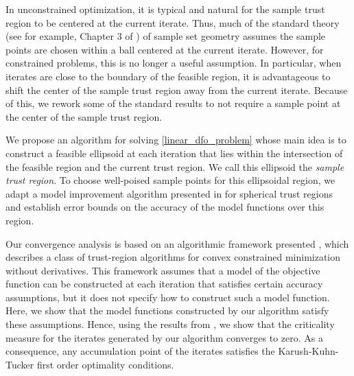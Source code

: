 \documentclass{article}
\begin{document}

In unconstrained optimization, it is typical and natural for the sample trust region to be centered at the current iterate.
Thus, much of the standard theory (see for example,
 Chapter 3 of \cite{introduction_book}) of sample set geometry assumes the sample points are chosen within a ball centered at the current iterate.
 However, for constrained problems,  this is no longer a useful assumption.
 In particular, when iterates are close to the boundary of the feasible region, it is advantageous to shift the center of the sample trust region away from the current iterate.
 Because of this, we rework some of the standard results to not require a sample point at the center of the sample trust region.


We propose an algorithm for solving \cref{linear_dfo_problem} whose main idea is to construct a feasible ellipsoid at each iteration that lies within the intersection of the feasible region and the current trust region.   We call this ellipsoid the {\em sample trust region}.
To choose well-poised sample points for this ellipsoidal region,  we adapt a model improvement algorithm presented in \cite{introduction_book} for spherical trust regions and establish error bounds on the accuracy of the model functions over this region.    

Our convergence analysis is based on an algorithmic framework presented \cite{Conejo:2013:GCT:2620806.2621814},  which describes a class of trust-region algorithms for convex constrained minimization without derivatives.   This framework assumes that a model of the objective function can be constructed at each iteration that satisfies certain accuracy assumptions, but it does not specify how to construct such a model function.    Here, we show that the model functions constructed by our algorithm satisfy these assumptions.  Hence,  using the results from \cite{Conejo:2013:GCT:2620806.2621814}, we show that
the criticality measure for the iterates generated by our algorithm converges to zero.  As a consequence, any accumulation point of the iterates satisfies the Karush-Kuhn-Tucker first order optimality conditions.  
\end{document}
